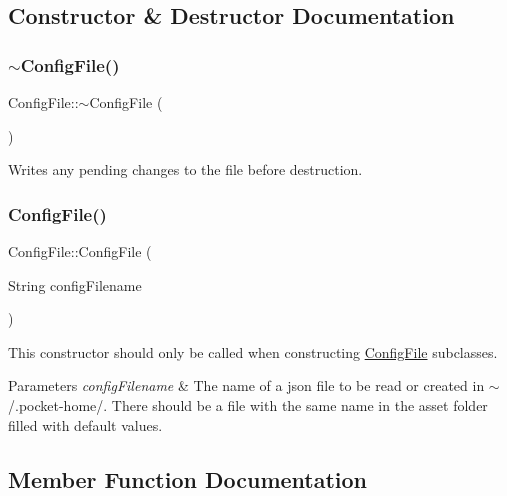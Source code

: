 \subsection{Constructor \& Destructor Documentation}
\mbox{\label{classConfigFile_ae73765f7f0320bb6422da1cebe866f31}} 
\subsubsection{\texorpdfstring{$\sim$\+Config\+File()}{~ConfigFile()}}
{\footnotesize\ttfamily Config\+File\+::$\sim$\+Config\+File (\begin{DoxyParamCaption}{ }\end{DoxyParamCaption})\hspace{0.3cm}{\ttfamily [virtual]}}

Writes any pending changes to the file before destruction. \mbox{\label{classConfigFile_a6a763d70b03214a2435ff38840d1db34}} 
\subsubsection{\texorpdfstring{Config\+File()}{ConfigFile()}}
{\footnotesize\ttfamily Config\+File\+::\+Config\+File (\begin{DoxyParamCaption}\item[{String}]{config\+Filename }\end{DoxyParamCaption})\hspace{0.3cm}{\ttfamily [protected]}}

This constructor should only be called when constructing \mbox{\hyperlink{classConfigFile}{Config\+File}} subclasses.


\begin{DoxyParams}{Parameters}
{\em config\+Filename} & The name of a json file to be read or created in $\sim$/.pocket-\/home/. There should be a file with the same name in the asset folder filled with default values. \\
\hline
\end{DoxyParams}


\subsection{Member Function Documentation}
\mbox{\label{classConfigFile_a6bb53ad4195ac634155039149b01922d}} 
